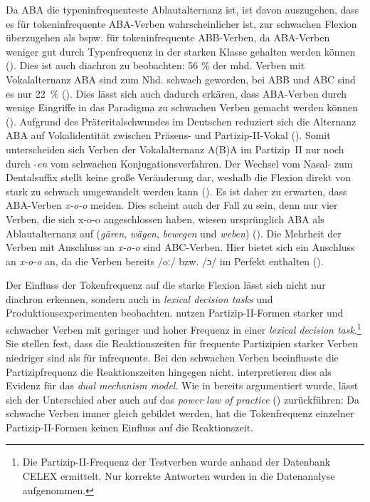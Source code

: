 Da ABA die typeninfrequenteste Ablautalternanz ist, ist davon auszugehen, dass es für tokeninfrequente ABA-Verben wahrscheinlicher ist, zur schwachen Flexion überzugehen als bspw. für tokeninfrequente ABB-Ver\-ben, da ABA-Ver\-ben weniger gut durch Typenfrequenz in der starken Klasse gehalten werden können (\cite[161]{Nowak.2018}). Dies ist auch diachron zu beobachten: 56 \% der mhd. Verben mit Vokalalternanz ABA sind zum Nhd. schwach geworden, bei ABB und ABC sind es nur 22~\% (\cite[323--324]{Solms.1984}). Dies lässt sich auch dadurch erkären, dass ABA-Verben durch wenige Eingriffe in das Paradigma zu schwachen Verben gemacht werden können (\cite[141]{Nowak.2016}). Aufgrund des Präteritalschwundes im Deutschen reduziert sich die Alternanz ABA auf Vokalidentität zwischen Präsens- und Partizip-II-Vokal (\cite[141]{Nowak.2016}). Somit unterscheiden sich Verben der Vokalalternanz A(B)A  im Partizip~II nur noch durch -\textit{en} vom schwachen Konjugationsverfahren. Der Wechsel vom Nasal- zum Dentalsuffix stellt keine große Veränderung dar, weshalb die Flexion direkt von stark zu schwach umgewandelt werden kann (\cite[141]{Nowak.2016}). Es ist daher zu erwarten, dass ABA-Verben \textit{x-o-o} meiden. Dies scheint auch der Fall zu sein, denn nur vier Verben, die sich x-o-o angeschlossen haben, wiesen ursprünglich ABA als Ablautalternanz auf (\textit{gären}, \textit{wägen}, \textit{bewegen} und \textit{weben}) (\cite[132--133]{Nowak.2016}). Die Mehrheit der Verben mit Anschluss an \textit{x-o-o} sind ABC-Verben. Hier bietet sich ein Anschluss an \textit{x-o-o} an, da die Verben bereits /oː/ bzw. /ɔ/ im Perfekt enthalten (\cite[167]{Nowak.2018}).  

Der Einfluss der Tokenfrequenz auf die starke Flexion lässt sich nicht nur diachron erkennen, sondern auch in \textit{lexical decision tasks} und Produktionsexperimenten beobachten. \textcite[224--227]{Clahsen.1997} nutzen Partizip-II-Formen starker und schwacher Verben mit geringer und hoher Frequenz in einer \textit{lexical decision task}.\footnote{Die Partizip-II-Frequenz der Testverben wurde anhand der Datenbank CELEX ermittelt. Nur korrekte Antworten wurden in die Datenanalyse aufgenommen.} Sie stellen fest, dass die Reaktionszeiten für frequente Partizipien starker Verben niedriger sind als für infrequente. Bei den schwachen Verben beeinflusste die Partizipfrequenz die Reaktionszeiten hingegen nicht. \textcite[227]{Clahsen.1997} interpretieren dies als Evidenz für das \textit{dual mechanism model}. Wie in  bereits argumentiert wurde, lässt sich der Unterschied aber auch auf das \textit{power law of practice} (\cite[307]{Ellis.1998}) zurückführen: Da schwache Verben immer gleich gebildet werden, hat die Tokenfrequenz einzelner Partizip-II-Formen keinen Einfluss auf die Reaktionszeit.  

